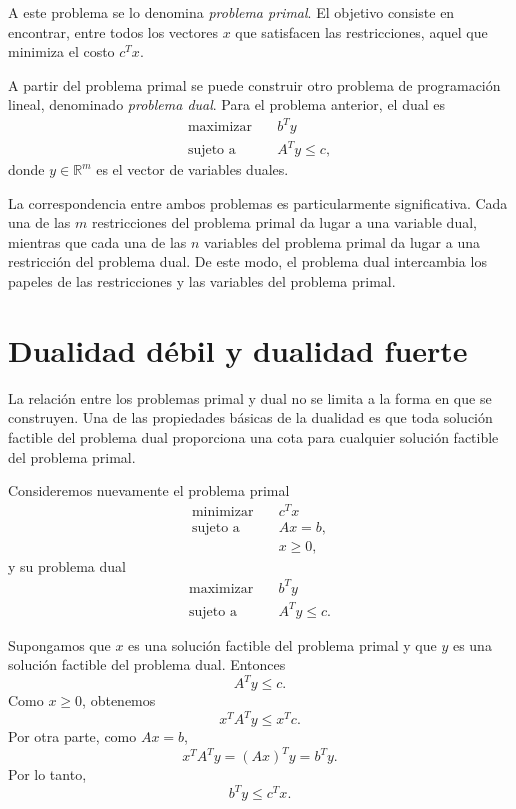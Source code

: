 \documentclass[12pt, a4paper]{amsbook}
\theoremstyle{remark}
\theoremstyle{definition}
\numberwithin{section}{chapter}
\numberwithin{subsection}{section}
\numberwithin{equation}{section}
\numberwithin{figure}{chapter}
\begin{document}
A este problema se lo denomina \emph{problema primal}. El objetivo consiste
en encontrar, entre todos los vectores $x$ que satisfacen las restricciones,
aquel que minimiza el costo $c^Tx$.

A partir del problema primal se puede construir otro problema de programación
lineal, denominado \emph{problema dual}. Para el problema anterior, el dual
es
\[
\begin{aligned}
\text{maximizar}\quad & b^T y\\
\text{sujeto a}\quad & A^T y\leq c,
\end{aligned}
\]
donde $y\in\mathbb R^m$ es el vector de variables duales.

La correspondencia entre ambos problemas es particularmente significativa.
Cada una de las $m$ restricciones del problema primal da lugar a una
variable dual, mientras que cada una de las $n$ variables del problema
primal da lugar a una restricción del problema dual. De este modo, el
problema dual intercambia los papeles de las restricciones y las variables
del problema primal.

\section{Dualidad débil y dualidad fuerte}

La relación entre los problemas primal y dual no se limita a la forma en que
se construyen. Una de las propiedades básicas de la dualidad es que
toda solución factible del problema dual proporciona una cota para cualquier
solución factible del problema primal.

Consideremos nuevamente el problema primal
\[
\begin{aligned}
\text{minimizar}\quad & c^T x\\
\text{sujeto a}\quad & Ax=b,\\
&x\geq0,
\end{aligned}
\]
y su problema dual
\[
\begin{aligned}
\text{maximizar}\quad & b^T y\\
\text{sujeto a}\quad & A^T y\leq c.
\end{aligned}
\]

Supongamos que $x$ es una solución factible del problema primal y que $y$
es una solución factible del problema dual. Entonces
\[
A^T y\leq c.
\]
Como $x\geq0$, obtenemos
\[
x^T A^T y\leq x^T c.
\]
Por otra parte, como $Ax=b$,
\[
x^T A^T y=(Ax)^T y=b^T y.
\]
Por lo tanto,
\[
b^T y\leq c^T x.
\]
\end{document}
